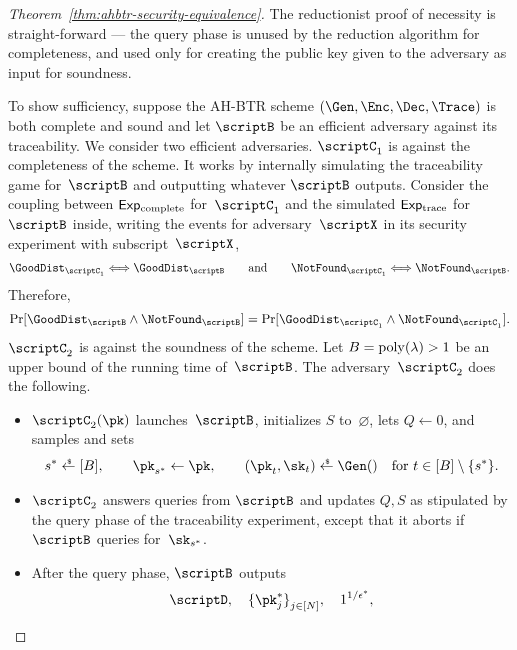 \begin{proof}
[%
Theorem~\ref{thm:ahbtr-security-equivalence}]
The reductionist proof of necessity is straight-forward ---
the query phase is
unused by the reduction algorithm for completeness, and
used only for creating the public key given to the adversary as input
for soundness.

To show sufficiency, suppose the AH-BTR scheme $(\Gen,\Enc,\Dec,\Trace)$ is both complete and sound and let $\scriptB$ be an efficient adversary against its traceability.
We consider two efficient adversaries.
$\scriptC_1$ is against the completeness of the scheme.
It works by internally simulating the traceability game for~$\scriptB$ and outputting whatever $\scriptB$ outputs.
Consider the coupling between $\ExpComplete$ for~$\scriptC_1$
and the simulated $\ExpTrace$ for~$\scriptB$ inside,
writing the events for adversary~$\scriptX$ in its security experiment with subscript~$\scriptX$,
\begin{align*}
\GoodDist_{\scriptC_1}
\Longleftrightarrow
\GoodDist_\scriptB
\qquad\textup{and}\qquad
\NotFound_{\scriptC_1}
\Longleftrightarrow
\NotFound_\scriptB.
\end{align*}
Therefore,
\begin{align*}
\Pr[\GoodDist_\scriptB\wedge\NotFound_\scriptB]
=
\Pr[\GoodDist_{\scriptC_1}\wedge\NotFound_{\scriptC_1}].
\end{align*}
$\scriptC_2$ is against the soundness of the scheme.
Let ${B=\operatorname{poly}(\lambda)>1}$ be an upper bound of the running time of~$\scriptB$.
The adversary~$\scriptC_2$ does the following.
\begin{itemize}
\item $\scriptC_2(\pk)$ launches~$\scriptB$,
initializes $S$ to~$\varnothing$,
lets ${Q\gets 0}$, and
samples and sets
\begin{align*}
s^\ast\draws[B],\qquad
\pk_{s^\ast}\gets\pk,\qquad
(\pk_t,\sk_t)\draws\Gen()\quad\textup{for }t\in{[B]\setminus{\{s^\ast\}}}.
\end{align*}
\item $\scriptC_2$ answers queries from $\scriptB$ and updates $Q,S$ as stipulated by the query phase of the traceability experiment, except that it aborts if $\scriptB$ queries for~$\sk_{s^\ast}$.
\item After the query phase, $\scriptB$ outputs
\begin{align*}
\scriptD,\quad
\{\pk_j^\ast\}_{j\in[N]}^\sphantom,\quad
1^{1/\epsilon^\ast},
\end{align*}

\end{itemize}
\end{proof}
